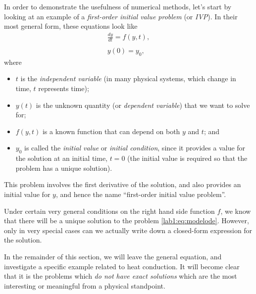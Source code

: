 In order to demonstrate the usefulness of numerical methods, let's
start by looking at an example of a \emph{first-order initial value
  problem} (or \emph{IVP}).  
In their most general form, these equations look like
\begin{equation}
  \begin{array}{c}
    {\displaystyle \frac{dy}{dt} = f(y,t),} \\
    \; \\
    y(0) = y_0, 
  \end{array}
  \label{lab1:eq:modelode} 
\end{equation}
where
\begin{itemize}
\item $t$ is the \emph{independent variable} (in many physical systems,
  which change in time, $t$ represents time);
\item $y(t)$ is the unknown quantity (or \emph{dependent variable}) that
  we want to solve for;
\item $f(y,t)$ is a known function that can depend on both $y$ and
  $t$; and 
\item $y_0$ is called the \emph{initial value} or \emph{initial
    condition}, since it provides a value for the solution at an
  initial time, $t=0$ (the initial value is required so that the
  problem has a unique solution).
\end{itemize}
This problem involves the first derivative of the solution, and
also provides an 
initial value for $y$, and hence the name ``first-order initial value
problem''.   

Under certain very general conditions on the right hand side function
$f$, we know that there will be a unique solution to the problem
\eqref{lab1:eq:modelode}.  However, only in very special cases can we
actually write down a closed-form expression for the solution.
 
In the remainder of this section, we will leave the general equation,
and investigate a specific example related to heat conduction.
It will become clear that it is the problems which \emph{do not have
  exact solutions} which are the most interesting or meaningful from a
physical standpoint.  

\begin{latexonly}
\end{latexonly}

